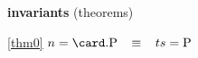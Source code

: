 \textbf{invariants} (theorems)
\begin{block}
\item[ \eqref{thm0} ]$n = \card.\Pcs \3\equiv ts = \Pcs$ %
\end{block}

